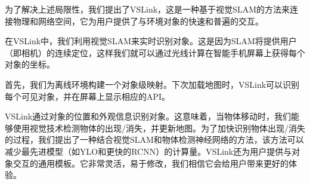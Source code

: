 %
为了解决上述局限性，我们提出了VSLink，这是一种基于视觉SLAM的方法来连接物理和网络空间，它为用户提供了与环境对象的快速和普遍的交互。

在VSLink中，我们利用视觉SLAM来实时识别对象。这是因为SLAM将提供用户（即相机）的连续定位，这样我们就可以通过光线计算在智能手机屏幕上获得每个对象的坐标。

首先，我们为离线环境构建一个对象级映射。下次加载地图时，VSLink可以识别每个可见对象，并在屏幕上显示相应的API。

VSLink通过对象的位置和外观信息识别对象。这意味着，当物体移动时，我们能够使用视觉技术检测物体的出现/消失，并更新地图。为了加快识别物体出现/消失的过程，我们提出了一种结合视觉SLAM和物体检测神经网络的方法，该方法可以减少最先进模型（如YLO和更快的RCNN）的计算量。VSLink还为用户提供与对象交互的通用模板。它非常灵活，易于修改，我们相信它会给用户带来更好的体验。

